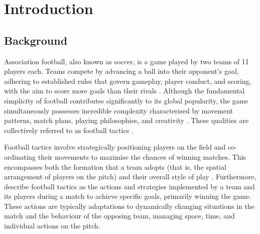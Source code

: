 
\chapter{Introduction}

\section{Background}

Association football, also known as soccer, is a game played by two teams of 11 players each. Teams compete by advancing a ball into their opponent's goal, adhering to established rules that govern gameplay, player conduct, and scoring, with the aim to score more goals than their rivals \citep{memmert_data_2018, sumpter_soccermatics_2016}. Although the fundamental simplicity of football contributes significantly to its global popularity, the game simultaneously possesses incredible complexity characterised by movement patterns, match plans, playing philosophies, and creativity \citep{bornn_soccer_2018, vicente_why_2024}. These qualities are collectively referred to as football tactics \citep{memmert_data_2018}.

Football tactics involve strategically positioning players on the field and co-ordinating their movements to maximise the chances of winning matches. This encompasses both the formation that a team adopts (that is, the spatial arrangement of players on the pitch) and their overall style of play \citep{wilson_inverting_2010}. Furthermore, \citet{rein_big_2016} describe football tactics as the actions and strategies implemented by a team and its players during a match to achieve specific goals, primarily winning the game. These actions are typically adaptations to dynamically changing situations in the match and the behaviour of the opposing team, managing space, time, and individual actions on the pitch.

